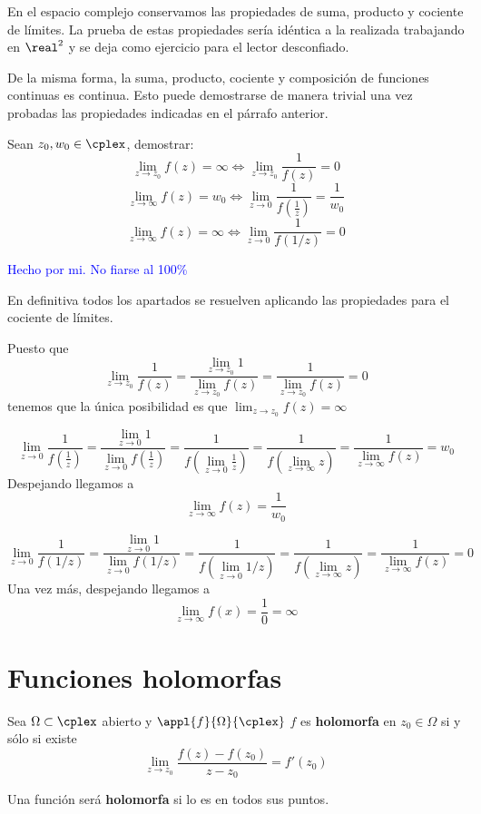 \documentclass{apuntes}
\begin{document}
En el espacio complejo conservamos las propiedades de suma, producto y cociente de límites. La prueba de estas propiedades sería idéntica a la realizada trabajando en $\real^2$ y se deja como ejercicio para el lector desconfiado.

De la misma forma, la suma, producto, cociente y composición de funciones continuas es continua. Esto puede demostrarse de manera trivial una vez probadas las propiedades indicadas en el párrafo anterior.

\begin{problem}[1]
Sean $z_0, w_0 \in \cplex$, demostrar:
\ppart \[\lim_{z\to z_0} f(z) = \infty \iff \lim_{z\to z_0}\frac{1}{f(z)}=0\]
\ppart \[\lim_{z\to \infty} f(z) = w_0 \iff \lim_{z\to 0}\frac{1}{f(\frac{1}{z})}=\frac{1}{w_0}\]
\ppart \[\lim_{z\to \infty} f(z) = \infty \iff \lim_{z\to 0}\frac{1}{f(1/z)}=0\]

\solution
\textcolor{blue}{Hecho por mi. No fiarse al 100\%}

En definitiva todos los apartados se resuelven aplicando las propiedades para el cociente de límites.

\spart
Puesto que
\[\lim_{z\to z_0}\frac{1}{f(z)}=\frac{\lim_{z\to z_0}1}{\lim_{z\to z_0}f(z)}=\frac{1}{\lim_{z\to z_0}f(z)}=0\]
tenemos que la única posibilidad es que $\lim_{z\to z_0}f(z)=\infty$

\spart
\[\lim_{z\to 0}\frac{1}{f(\frac{1}{z})}=\frac{\lim_{z\to 0}1}{\lim_{z\to 0}f(\frac{1}{z})}=\frac{1}{f(\lim_{z\to 0}\frac{1}{z})}=\frac{1}{f(\lim_{z\to \infty}z)}=\frac{1}{\lim_{z\to \infty}f(z)}=w_0\]
Despejando llegamos a
\[\lim_{z\to \infty}f(z)=\frac{1}{w_0}\]

\spart
\[\lim_{z\to 0}\frac{1}{f(1/z)}=\frac{\lim_{z\to 0}1}{\lim_{z\to 0}f(1/z)}=\frac{1}{f(\lim_{z\to 0}1/z)} = \frac{1}{f(\lim_{z\to \infty}z)} = \frac{1}{\lim_{z\to \infty}f(z)}=0\]
Una vez más, despejando llegamos a
\[\lim_{z\to \infty} f(x) = \frac{1}{0}=\infty\]
\end{problem}


\chapter{Funciones holomorfas}
\begin{defn}
Sea $\Omega \subset \cplex$ abierto y $\appl{f}{\Omega}{\cplex}$ $f$ es \textbf{holomorfa} en $z_0 \in \Omega$ si y sólo si existe
\[\lim_{z\to z_0} \frac{f(z)-f(z_0)}{z-z_0}= f'(z_0)\]

Una función será \textbf{holomorfa} si lo es en todos sus puntos.
\end{defn}
\end{document}

